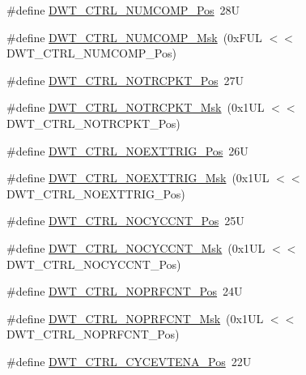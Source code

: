 \begin{DoxyCompactItemize}
\item 
\#define \hyperlink{group___c_m_s_i_s___d_w_t_gaac44b9b7d5391a7ffef129b7f6c84cd7}{D\+W\+T\+\_\+\+C\+T\+R\+L\+\_\+\+N\+U\+M\+C\+O\+M\+P\+\_\+\+Pos}~28U
\item 
\#define \hyperlink{group___c_m_s_i_s___d_w_t_gaa3d37d68c2ba73f2026265584c2815e7}{D\+W\+T\+\_\+\+C\+T\+R\+L\+\_\+\+N\+U\+M\+C\+O\+M\+P\+\_\+\+Msk}~(0x\+F\+U\+L $<$$<$ D\+W\+T\+\_\+\+C\+T\+R\+L\+\_\+\+N\+U\+M\+C\+O\+M\+P\+\_\+\+Pos)
\item 
\#define \hyperlink{group___c_m_s_i_s___d_w_t_gaa82840323a2628e7f4a2b09b74fa73fd}{D\+W\+T\+\_\+\+C\+T\+R\+L\+\_\+\+N\+O\+T\+R\+C\+P\+K\+T\+\_\+\+Pos}~27U
\item 
\#define \hyperlink{group___c_m_s_i_s___d_w_t_ga04d8bb0a065ca38e2e5f13a97e1f7073}{D\+W\+T\+\_\+\+C\+T\+R\+L\+\_\+\+N\+O\+T\+R\+C\+P\+K\+T\+\_\+\+Msk}~(0x1\+U\+L $<$$<$ D\+W\+T\+\_\+\+C\+T\+R\+L\+\_\+\+N\+O\+T\+R\+C\+P\+K\+T\+\_\+\+Pos)
\item 
\#define \hyperlink{group___c_m_s_i_s___d_w_t_gad997b9026715d5609b5a3b144eca42d0}{D\+W\+T\+\_\+\+C\+T\+R\+L\+\_\+\+N\+O\+E\+X\+T\+T\+R\+I\+G\+\_\+\+Pos}~26U
\item 
\#define \hyperlink{group___c_m_s_i_s___d_w_t_gacc7d15edf7a27147c422099ab475953e}{D\+W\+T\+\_\+\+C\+T\+R\+L\+\_\+\+N\+O\+E\+X\+T\+T\+R\+I\+G\+\_\+\+Msk}~(0x1\+U\+L $<$$<$ D\+W\+T\+\_\+\+C\+T\+R\+L\+\_\+\+N\+O\+E\+X\+T\+T\+R\+I\+G\+\_\+\+Pos)
\item 
\#define \hyperlink{group___c_m_s_i_s___d_w_t_ga337f6167d960f57f12aa382ffecce522}{D\+W\+T\+\_\+\+C\+T\+R\+L\+\_\+\+N\+O\+C\+Y\+C\+C\+N\+T\+\_\+\+Pos}~25U
\item 
\#define \hyperlink{group___c_m_s_i_s___d_w_t_gaf40c8d7a4fd978034c137e90f714c143}{D\+W\+T\+\_\+\+C\+T\+R\+L\+\_\+\+N\+O\+C\+Y\+C\+C\+N\+T\+\_\+\+Msk}~(0x1\+U\+L $<$$<$ D\+W\+T\+\_\+\+C\+T\+R\+L\+\_\+\+N\+O\+C\+Y\+C\+C\+N\+T\+\_\+\+Pos)
\item 
\#define \hyperlink{group___c_m_s_i_s___d_w_t_gad52a0e5be84363ab166cc17beca0d048}{D\+W\+T\+\_\+\+C\+T\+R\+L\+\_\+\+N\+O\+P\+R\+F\+C\+N\+T\+\_\+\+Pos}~24U
\item 
\#define \hyperlink{group___c_m_s_i_s___d_w_t_gafd8448d7db4bc51f27f202e6e1f27823}{D\+W\+T\+\_\+\+C\+T\+R\+L\+\_\+\+N\+O\+P\+R\+F\+C\+N\+T\+\_\+\+Msk}~(0x1\+U\+L $<$$<$ D\+W\+T\+\_\+\+C\+T\+R\+L\+\_\+\+N\+O\+P\+R\+F\+C\+N\+T\+\_\+\+Pos)
\item 
\#define \hyperlink{group___c_m_s_i_s___d_w_t_ga0cb0640aaeb18a626d7823570d5c3cb6}{D\+W\+T\+\_\+\+C\+T\+R\+L\+\_\+\+C\+Y\+C\+E\+V\+T\+E\+N\+A\+\_\+\+Pos}~22U
$$
\end{DoxyCompactItemize}
